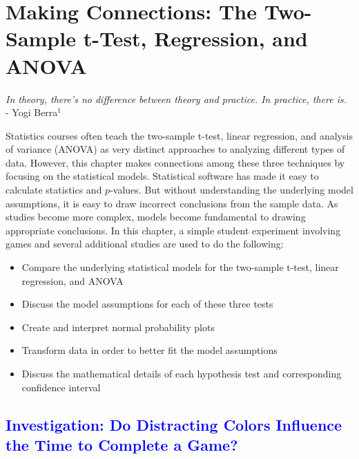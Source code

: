 \documentclass[
]{report}
\begin{document}
\hypertarget{making-connections-the-two-sample-t-test-regression-and-anova}{%
\chapter{Making Connections: The Two-Sample t-Test, Regression, and ANOVA}\label{making-connections-the-two-sample-t-test-regression-and-anova}}

\begin{flushright}
\emph{In theory, there’s no difference between theory and practice. In practice, there is.} \\
- Yogi Berra$^1$
\end{flushright}

Statistics courses often teach the two-sample t-test, linear regression, and analysis of variance (ANOVA) as very distinct approaches to analyzing different types of data. However, this chapter makes connections among these three techniques by focusing on the statistical models. Statistical software has made it easy to calculate statistics and \(\scriptstyle p\)-values. But without understanding the underlying model assumptions, it is easy to draw incorrect conclusions from the sample data. As studies become more complex, models become fundamental to drawing appropriate conclusions. In this chapter, a simple student experiment involving games and several additional studies are used to do the following:

\vspace{-1em}
\begin{itemize}
\item Compare the underlying statistical models for the two-sample t-test, linear regression, and
ANOVA
\item Discuss the model assumptions for each of these three tests
\item Create and interpret normal probability plots
\item Transform data in order to better fit the model assumptions
\item Discuss the mathematical details of each hypothesis test and corresponding confidence interval
\end{itemize}

\newpage

\hypertarget{section-14}{%
\section{\texorpdfstring{\textcolor{blue}{ Investigation: Do Distracting Colors Influence the Time to Complete a Game?}}{}}\label{section-14}}
\end{document}
